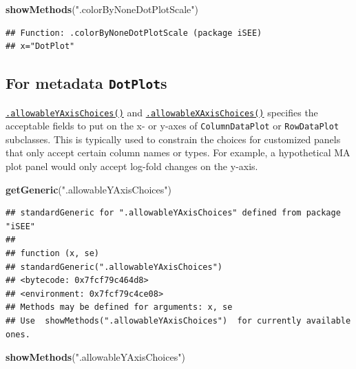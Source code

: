 \documentclass[
]{book}
\newenvironment{Shaded}{\begin{snugshade}}{\end{snugshade}}
\newcommand{\KeywordTok}[1]{\textcolor[rgb]{0.13,0.29,0.53}{\textbf{#1}}}
\newcommand{\NormalTok}[1]{#1}
\newcommand{\StringTok}[1]{\textcolor[rgb]{0.31,0.60,0.02}{#1}}
\begin{document}
\begin{Shaded}
\begin{Highlighting}[]
\KeywordTok{showMethods}\NormalTok{(}\StringTok{".colorByNoneDotPlotScale"}\NormalTok{)}
\end{Highlighting}
\end{Shaded}

\begin{verbatim}
## Function: .colorByNoneDotPlotScale (package iSEE)
## x="DotPlot"
\end{verbatim}

\hypertarget{for-metadata-dotplots}{%
\subsection{\texorpdfstring{For metadata \texttt{DotPlot}s}{For metadata DotPlots}}\label{for-metadata-dotplots}}

\href{https://isee.github.io/iSEE/reference/metadata-plot-generics.html}{\texttt{.allowableYAxisChoices()}} and \href{https://isee.github.io/iSEE/reference/metadata-plot-generics.html}{\texttt{.allowableXAxisChoices()}} specifies the acceptable fields to put on the x- or y-axes of \texttt{ColumnDataPlot} or \texttt{RowDataPlot} subclasses.
This is typically used to constrain the choices for customized panels that only accept certain column names or types.
For example, a hypothetical MA plot panel would only accept log-fold changes on the y-axis.

\begin{Shaded}
\begin{Highlighting}[]
\KeywordTok{getGeneric}\NormalTok{(}\StringTok{".allowableYAxisChoices"}\NormalTok{)}
\end{Highlighting}
\end{Shaded}

\begin{verbatim}
## standardGeneric for ".allowableYAxisChoices" defined from package "iSEE"
## 
## function (x, se) 
## standardGeneric(".allowableYAxisChoices")
## <bytecode: 0x7fcf79c464d8>
## <environment: 0x7fcf79c4ce08>
## Methods may be defined for arguments: x, se
## Use  showMethods(".allowableYAxisChoices")  for currently available ones.
\end{verbatim}

\begin{Shaded}
\begin{Highlighting}[]
\KeywordTok{showMethods}\NormalTok{(}\StringTok{".allowableYAxisChoices"}\NormalTok{)}
\end{Highlighting}
\end{Shaded}
\end{document}

